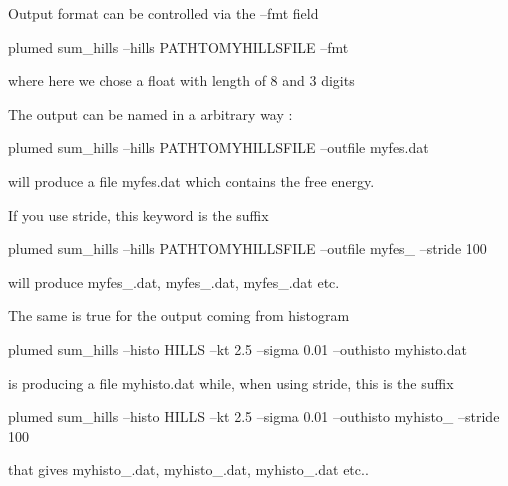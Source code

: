 Output format can be controlled via the --fmt field

\begin{DoxyVerb}plumed sum_hills --hills PATHTOMYHILLSFILE  --fmt %
\end{DoxyVerb}


where here we chose a float with length of 8 and 3 digits

The output can be named in a arbitrary way \+:

\begin{DoxyVerb}plumed sum_hills --hills PATHTOMYHILLSFILE  --outfile myfes.dat 
\end{DoxyVerb}


will produce a file myfes.\+dat which contains the free energy.

If you use stride, this keyword is the suffix

\begin{DoxyVerb}plumed sum_hills --hills PATHTOMYHILLSFILE  --outfile myfes_ --stride 100
\end{DoxyVerb}


will produce myfes\+\_.\+dat, myfes\+\_.\+dat, myfes\+\_.\+dat etc.

The same is true for the output coming from histogram \begin{DoxyVerb}plumed sum_hills --histo HILLS --kt 2.5 --sigma 0.01 --outhisto myhisto.dat
\end{DoxyVerb}


is producing a file myhisto.\+dat while, when using stride, this is the suffix

\begin{DoxyVerb}plumed sum_hills --histo HILLS --kt 2.5 --sigma 0.01 --outhisto myhisto_ --stride 100 
\end{DoxyVerb}


that gives myhisto\+\_.\+dat, myhisto\+\_.\+dat, myhisto\+\_.\+dat etc.. 